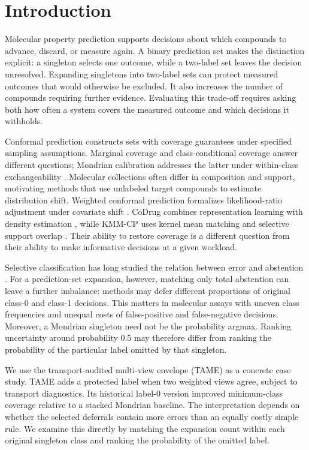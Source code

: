 \section{Introduction}
Molecular property prediction supports decisions about which compounds to advance, discard, or measure again. A binary prediction set makes the distinction explicit: a singleton selects one outcome, while a two-label set leaves the decision unresolved. Expanding singletons into two-label sets can protect measured outcomes that would otherwise be excluded. It also increases the number of compounds requiring further evidence. Evaluating this trade-off requires asking both how often a system covers the measured outcome and which decisions it withholds.

Conformal prediction constructs sets with coverage guarantees under specified sampling assumptions. Marginal coverage and class-conditional coverage answer different questions; Mondrian calibration addresses the latter under within-class exchangeability \citep{vovk2012}. Molecular collections often differ in composition and support, motivating methods that use unlabeled target compounds to estimate distribution shift. Weighted conformal prediction formalizes likelihood-ratio adjustment under covariate shift \citep{tibshirani2019}. CoDrug combines representation learning with density estimation \citep{codrug2023}, while KMM-CP uses kernel mean matching and selective support overlap \citep{kmm2026}. Their ability to restore coverage is a different question from their ability to make informative decisions at a given workload.

Selective classification has long studied the relation between error and abstention \citep{elyaniv2010}. For a prediction-set expansion, however, matching only total abstention can leave a further imbalance: methods may defer different proportions of original class-0 and class-1 decisions. This matters in molecular assays with uneven class frequencies and unequal costs of false-positive and false-negative decisions. Moreover, a Mondrian singleton need not be the probability argmax. Ranking uncertainty around probability 0.5 may therefore differ from ranking the probability of the particular label omitted by that singleton.

We use the transport-audited multi-view envelope (TAME) as a concrete case study. TAME adds a protected label when two weighted views agree, subject to transport diagnostics. Its historical label-0 version improved minimum-class coverage relative to a stacked Mondrian baseline. The interpretation depends on whether the selected deferrals contain more errors than an equally costly simple rule. We examine this directly by matching the expansion count within each original singleton class and ranking the probability of the omitted label.

